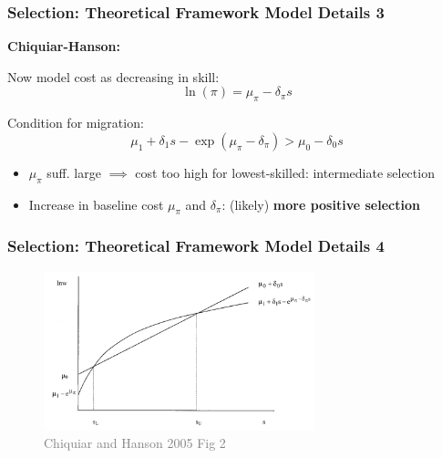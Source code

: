 \documentclass[xcolor=dvipsnames, compress, 12pt, aspectratio=169, handout]{beamer}
\begin{document}
\begin{frame}
    \label{theory3}
    \frametitle{Selection: Theoretical Framework Model Details 3 \hyperlink{theory_main}{}}
    \textbf{Chiquiar-Hanson:} \vspace{1mm}

    Now model cost as decreasing in skill: 
    \begin{equation}
        \ln(\pi) = \mu_{\pi} - \delta_{\pi}s 
    \end{equation} 
    \vspace{1mm}

    Condition for migration:
    \begin{equation}
        \mu_1 + \delta_1 s - \exp(\mu_{\pi} - \delta_{\pi}) > \mu_0 - \delta_0s
    \end{equation}
    \vspace{1mm}
    \begin{itemize}
        \item $\mu_{\pi}$ suff. large $\implies$ cost too high for lowest-skilled: intermediate selection \vspace{1mm}
        \item Increase in baseline cost $\mu_{\pi}$ and $\delta_{\pi}$: (likely) \textbf{more positive selection}
    \end{itemize}
\end{frame}

\begin{frame}
    \label{theory4}
    \frametitle{Selection: Theoretical Framework Model Details 4 \hyperlink{theory_main}{}}
    \begin{figure}
        \includegraphics[width = 0.7\textwidth]{../../figs/slides/chiquiarhanson.png}
        \caption{\textcolor{gray}{Chiquiar and Hanson 2005 Fig 2}}
    \end{figure}
\end{frame}
\end{document}

